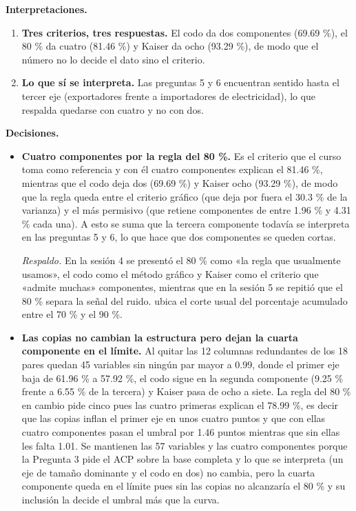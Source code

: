 \documentclass[oneside, openany, fontset=libertinus]{mitthesis}
\providecommand{\tightlist}{\setlength{\itemsep}{0pt}\setlength{\parskip}{0pt}}
\begin{document}
\begin{notas}

\textbf{Interpretaciones.}

\begin{enumerate}
\def\labelenumi{\alph{enumi}.}
\tightlist
\item
  \textbf{Tres criterios, tres respuestas.} El codo da dos componentes
  (69.69 \%), el 80 \% da cuatro (81.46 \%) y Kaiser da ocho (93.29 \%),
  de modo que el número no lo decide el dato sino el criterio.
\item
  \textbf{Lo que sí se interpreta.} Las preguntas 5 y 6 encuentran
  sentido hasta el tercer eje (exportadores frente a importadores de
  electricidad), lo que respalda quedarse con cuatro y no con dos.
\end{enumerate}

\textbf{Decisiones.}

\begin{itemize}
\item
  \textbf{Cuatro componentes por la regla del 80 \%.} Es el criterio que
  el curso toma como referencia y con él cuatro componentes explican el
  81.46 \%, mientras que el codo deja dos (69.69 \%) y Kaiser ocho
  (93.29 \%), de modo que la regla queda entre el criterio gráfico (que
  deja por fuera el 30.3 \% de la varianza) y el más permisivo (que
  retiene componentes de entre 1.96 \% y 4.31 \% cada una). A esto se
  suma que la tercera componente todavía se interpreta en las preguntas
  5 y 6, lo que hace que dos componentes se queden cortas.

  \emph{Respaldo.} En la sesión 4 se presentó el 80 \% como «la regla
  que usualmente usamos», el codo como el método gráfico y Kaiser como
  el criterio que «admite muchas» componentes, mientras que en la sesión
  5 se repitió que el 80 \% separa la señal del ruido.
  \textcite[\S~6.1.1]{jolliffe2002} ubica el corte usual del porcentaje
  acumulado entre el 70 \% y el 90 \%.
\item
  \textbf{Las copias no cambian la estructura pero dejan la cuarta
  componente en el límite.} Al quitar las 12 columnas redundantes de los
  18 pares quedan 45 variables sin ningún par mayor a 0.99, donde el
  primer eje baja de 61.96 \% a 57.92 \%, el codo sigue en la segunda
  componente (9.25 \% frente a 6.55 \% de la tercera) y Kaiser pasa de
  ocho a siete. La regla del 80 \% en cambio pide cinco pues las cuatro
  primeras explican el 78.99 \%, es decir que las copias inflan el
  primer eje en unos cuatro puntos y que con ellas cuatro componentes
  pasan el umbral por 1.46 puntos mientras que sin ellas les falta 1.01.
  Se mantienen las 57 variables y las cuatro componentes porque la
  Pregunta 3 pide el ACP sobre la base completa y lo que se interpreta
  (un eje de tamaño dominante y el codo en dos) no cambia, pero la
  cuarta componente queda en el límite pues sin las copias no alcanzaría
  el 80 \% y su inclusión la decide el umbral más que la curva.


\end{itemize}
\end{notas}
\end{document}
